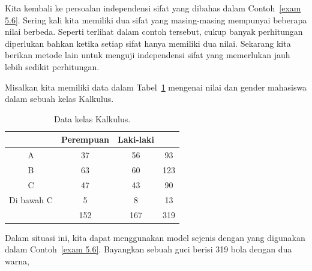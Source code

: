 Kita kembali ke persoalan independensi sifat yang dibahas
dalam Contoh~\ref{exam 5.6}.  Sering kali kita memiliki dua sifat yang masing-masing
mempunyai beberapa nilai berbeda.  Seperti terlihat dalam contoh tersebut, cukup
banyak perhitungan diperlukan bahkan ketika setiap sifat hanya memiliki dua nilai.
Sekarang kita berikan metode lain untuk menguji independensi sifat yang memerlukan
jauh lebih sedikit perhitungan.
\begin{example}\label{exam 5.20}
Misalkan kita memiliki data dalam Tabel~\ref{table 5.7} mengenai nilai dan gender
mahasiswa dalam sebuah kelas Kalkulus.
\begin{table}
\centering
\begin{tabular}{|c|c|c|c|}
\hline
       &Perempuan\hspace{.15in}&\hspace{.15in}Laki-laki\hspace{.15in}& \\ \hline 
A      & \hspace{.15in}37  & \hspace{.15in}56                &\hspace{.15in}93  \\ \hline 
B      & \hspace{.15in}63  & \hspace{.15in}60                &\hspace{.075in}123\\ \hline 
C      & \hspace{.15in}47  & \hspace{.15in}43                &\hspace{.15in}90  \\ \hline 
Di bawah C& \hspace{.25in}5   & \hspace{.25in}8                 &\hspace{.15in}13  \\ \hline 
       &\hspace{.1in}152   &\hspace{.1in}167                 &\hspace{.075in}319\\ \hline
\end{tabular}
\caption{Data kelas Kalkulus.}
\label{table 5.7}
\end{table}
Dalam situasi ini, kita dapat menggunakan model sejenis dengan yang digunakan dalam
Contoh~\ref{exam 5.6}.  Bayangkan sebuah guci berisi 319 bola dengan dua warna,

\end{example}
